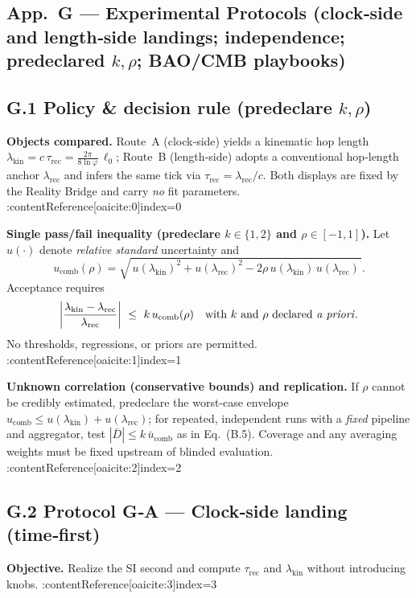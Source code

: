 \documentclass[11pt]{article}
\begin{document}
\begin{proposition}
\section*{App.\ G — Experimental Protocols (clock‑side and length‑side landings; independence; predeclared $k,\rho$; BAO/CMB playbooks)}

\subsection*{G.1 Policy \& decision rule (predeclare $k,\rho$)}
\textbf{Objects compared.} Route~A (clock‑side) yields a kinematic hop length $\lambda_{\mathrm{kin}}=c\,\tau_{\mathrm{rec}}=\frac{2\pi}{8\ln\varphi}\,\ell_{0}$; Route~B (length‑side) adopts a conventional hop‑length anchor $\lambda_{\mathrm{rec}}$ and infers the same tick via $\tau_{\mathrm{rec}}=\lambda_{\mathrm{rec}}/c$. Both displays are fixed by the Reality Bridge and carry \emph{no} fit parameters. :contentReference[oaicite:0]{index=0}

\textbf{Single pass/fail inequality (predeclare $k\in\{1,2\}$ and $\rho\in[-1,1]$).}
Let $u(\cdot)$ denote \emph{relative standard} uncertainty and
\[
u_{\mathrm{comb}}(\rho)
=\sqrt{\,u(\lambda_{\mathrm{kin}})^2+u(\lambda_{\mathrm{rec}})^2
-2\rho\,u(\lambda_{\mathrm{kin}})\,u(\lambda_{\mathrm{rec}})\,}.
\]
Acceptance requires
\[
\left|\frac{\lambda_{\mathrm{kin}}-\lambda_{\mathrm{rec}}}{\lambda_{\mathrm{rec}}}\right|
\ \le\ k\,u_{\mathrm{comb}}(\rho)\quad\text{with $k$ and $\rho$ declared \emph{a priori}}.
\]
No thresholds, regressions, or priors are permitted. :contentReference[oaicite:1]{index=1}

\textbf{Unknown correlation (conservative bounds) and replication.}
If $\rho$ cannot be credibly estimated, predeclare the worst‑case envelope
$u_{\mathrm{comb}}\le u(\lambda_{\mathrm{kin}})+u(\lambda_{\mathrm{rec}})$; for repeated, independent runs with a \emph{fixed} pipeline and aggregator, test $|\bar{D}|\le k\,\bar{u}_{\mathrm{comb}}$ as in Eq.~(B.5). Coverage and any averaging weights must be fixed upstream of blinded evaluation. :contentReference[oaicite:2]{index=2}

\medskip

\subsection*{G.2 Protocol G‑A — Clock‑side landing (time‑first)}
\textbf{Objective.} Realize the SI second and compute $\tau_{\mathrm{rec}}$ and $\lambda_{\mathrm{kin}}$ without introducing knobs. :contentReference[oaicite:3]{index=3}


\end{proposition}
\end{document}
